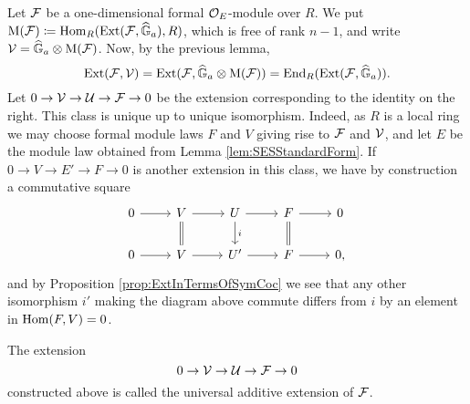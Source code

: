 \documentclass[../main.tex]{subfiles}
\begin{document}
Let $\mathcal{F}$ be a one-dimensional formal ${\mathcal{O}_E}$-module over $R$.
We put $\mathrm M(\mathcal{F}) \coloneqq \operatorname{Hom}_R(\operatorname{Ext}(\mathcal{F}, \widehat{\mathbb{G}}_a), R)$, which is free of
rank $n-1$, and
write $\mathcal{V} = \widehat{\mathbb{G}}_a \otimes \mathrm M(\mathcal{F})$. Now, by the previous lemma,
\begin{equation*}
  \operatorname{Ext}(\mathcal{F},\mathcal{V}) = \operatorname{Ext}(\mathcal{F}, \widehat{\mathbb{G}}_a \otimes \mathrm M(\mathcal{F})) = \operatorname{End}_R(\operatorname{Ext}(\mathcal{F}, \widehat{\mathbb{G}}_a)). 
\end{equation*}
Let $0 \to \mathcal{V} \to \mathcal{U} \to \mathcal{F} \to 0$ be the extension corresponding to the identity 
on the right. This class is unique up to unique isomorphism. Indeed, 
as $R$ is a local ring we may choose formal module laws $F$ and $V$ giving rise
to $\mathcal{F}$ and $\mathcal{V}$, and let $E$ be the module law obtained from 
Lemma \ref{lem:SESStandardForm}. 
If $0 \to V \to E' \to F \to 0$ is another extension in this class, we
have by construction a commutative square
\begin{equation*}
\begin{tikzcd}[ampersand replacement=\&]
	0 \& {V} \& U \& F \& 0 \\
	0 \& {V} \& {U'} \& F \& 0,
	\arrow[from=1-1, to=1-2]
	\arrow[from=1-2, to=1-3]
	\arrow[Rightarrow, no head, from=1-2, to=2-2]
	\arrow[from=1-3, to=1-4]
	\arrow["i", from=1-3, to=2-3]
	\arrow[from=1-4, to=1-5]
	\arrow[Rightarrow, no head, from=1-4, to=2-4]
	\arrow[from=2-1, to=2-2]
	\arrow[from=2-2, to=2-3]
	\arrow[from=2-3, to=2-4]
	\arrow[from=2-4, to=2-5]
\end{tikzcd}
\end{equation*}
and by Proposition \ref{prop:ExtInTermsOfSymCoc} we see that 
any other isomorphism $i'$ making the diagram above commute differs from
$i$ by an element in $\operatorname{Hom}(F, V) = 0$. 

\begin{defi}
  The extension
  \begin{equation*}
    0 \to \mathcal{V} \to \mathcal{U} \to \mathcal{F} \to 0
  \end{equation*}
  constructed above is called the universal additive extension of $\mathcal{F}$.
\end{defi}
\end{document}
